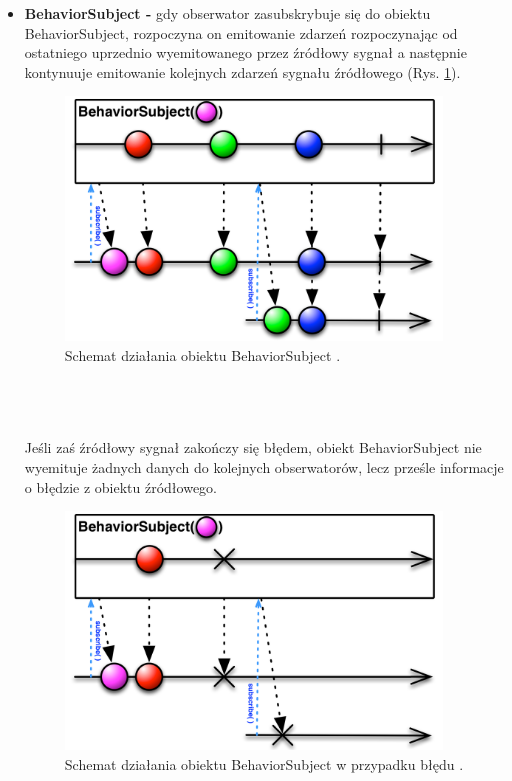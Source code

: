 \documentclass[12pt,oneside,a4paper]{report}
\begin{document}
\begin{itemize}
	
	\item \textbf{BehaviorSubject -} gdy obserwator zasubskrybuje się do obiektu BehaviorSubject, rozpoczyna on emitowanie zdarzeń rozpoczynając od ostatniego uprzednio wyemitowanego przez źródłowy sygnał a następnie kontynuuje emitowanie kolejnych zdarzeń sygnału źródłowego (Rys. \ref{behaviorSubject}).
	\begin{figure}[ht!]
		\centering
		\includegraphics[width=10cm]{behaviorSubject}
		\caption{Schemat działania obiektu BehaviorSubject \cite{subjects}.}
		\label{behaviorSubject}
	\end{figure}
	\\
	\\
	\\ 
	Jeśli zaś źródłowy sygnał zakończy się błędem, obiekt BehaviorSubject nie wyemituje żadnych danych do kolejnych obserwatorów, lecz prześle informacje o błędzie z obiektu źródłowego.
	\begin{figure}[ht!]
		\centering
		\includegraphics[width=10cm]{behaviorSubjectFailed}
		\caption{Schemat działania obiektu BehaviorSubject w przypadku błędu \cite{subjects}.}
		\label{behaviorSubjectFailed}
	\end{figure}
	

\end{itemize}
\end{document}
